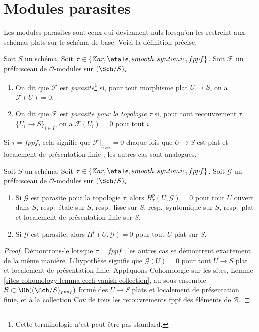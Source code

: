 




\section{Modules parasites}
\label{section-parasitic}

\noindent
Les modules parasites sont ceux qui deviennent nuls lorsqu'on les restreint
aux schémas plats sur le schéma de base. Voici la définition précise.

\begin{definition}
\label{definition-parasitic}
Soit $S$ un schéma. Soit $\tau \in \{Zar, \etale,
smooth, syntomic, fppf\}$. Soit $\mathcal{F}$ un préfaisceau de
$\mathcal{O}$-modules sur $(\Sch/S)_\tau$.
\begin{enumerate}
\item On dit que $\mathcal{F}$ est
{\it parasite}\footnote{Cette terminologie n'est peut-être pas standard.}
si, pour tout morphisme plat $U \to S$, on a $\mathcal{F}(U) = 0$.
\item On dit que $\mathcal{F}$ est {\it parasite pour la topologie $\tau$}
si, pour tout recouvrement $\tau$,
$\{U_i \to S\}_{i \in I}$, on a $\mathcal{F}(U_i) = 0$ pour tout $i$.
\end{enumerate}
\end{definition}

\noindent
Si $\tau = fppf$, cela signifie que $\mathcal{F}|_{U_{Zar}} = 0$ chaque fois
que $U \to S$ est plat et localement de présentation finie ; les autres cas
sont analogues.

\begin{lemma}
\label{lemma-cohomology-parasitic}
Soit $S$ un schéma. Soit $\tau \in \{Zar, \etale, smooth,
syntomic, fppf\}$. Soit $\mathcal{G}$ un préfaisceau de
$\mathcal{O}$-modules sur $(\Sch/S)_\tau$.
\begin{enumerate}
\item Si $\mathcal{G}$ est parasite pour la topologie $\tau$, alors
$H^p_\tau(U, \mathcal{G}) = 0$ pour tout $U$ ouvert dans $S$,
resp.\ \'etale sur $S$,
resp.\ lisse sur $S$,
resp.\ syntomique sur $S$,
resp.\ plat et localement de présentation finie sur $S$.
\item Si $\mathcal{G}$ est parasite, alors
$H^p_\tau(U, \mathcal{G}) = 0$ pour tout $U$ plat sur $S$.
\end{enumerate}
\end{lemma}

\begin{proof}
Démontrons-le lorsque $\tau = fppf$ ; les autres cas se démontrent exactement
de la même manière. L'hypothèse signifie que $\mathcal{G}(U) = 0$ pour tout
$U \to S$ plat et localement de présentation finie. Appliquons Cohomologie
sur les sites, Lemme
\ref{sites-cohomology-lemma-cech-vanish-collection}, au sous-ensemble
$\mathcal{B} \subset \Ob((\Sch/S)_{fppf})$ formé des $U \to S$ plats et
localement de présentation finie, et à la collection $\text{Cov}$ de tous les
recouvrements fppf des éléments de $\mathcal{B}$.
\end{proof}

